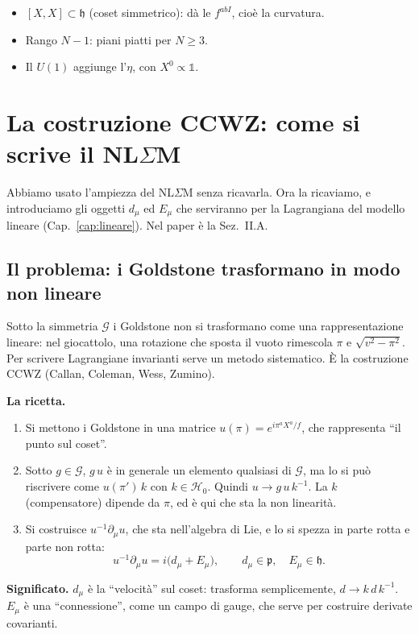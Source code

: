 \documentclass[11pt,a4paper]{article}
\numberwithin{equation}{section}
\theoremstyle{remark}
\newcommand{\G}{\mathcal{G}}
\newcommand{\Hg}{\mathcal{H}_0}
\newcommand{\p}{\mathfrak{p}}
\newcommand{\h}{\mathfrak{h}}
\newcommand{\one}{\mathbb{1}}
\begin{document}
\begin{porta}
\begin{itemize}[nosep]
\item $[X,X]\subset\h$ (coset simmetrico): dà le $f^{abI}$, cioè la curvatura.
\item Rango $N-1$: piani piatti per $N\ge3$.
\item Il $U(1)$ aggiunge l'$\eta$, con $X^0\propto\one$.
\end{itemize}
\end{porta}

\section{La costruzione CCWZ: come si scrive il NL$\Sigma$M}
\label{cap:ccwz}

\begin{dove}
Abbiamo usato l'ampiezza del NL$\Sigma$M senza ricavarla. Ora la ricaviamo, e introduciamo gli oggetti $d_\mu$ ed $E_\mu$ che serviranno per la Lagrangiana del modello lineare (Cap.~\ref{cap:lineare}). Nel paper è la Sez.~II.A.
\end{dove}

\subsection{Il problema: i Goldstone trasformano in modo non lineare}

Sotto la simmetria $\G$ i Goldstone non si trasformano come una rappresentazione lineare: nel giocattolo, una rotazione che sposta il vuoto rimescola $\pi$ e $\sqrt{v^2-\pi^2}$. Per scrivere Lagrangiane invarianti serve un metodo sistematico. È la costruzione CCWZ (Callan, Coleman, Wess, Zumino).

\textbf{La ricetta.}
\begin{enumerate}
\item Si mettono i Goldstone in una matrice $u(\pi)=e^{i\pi^aX^a/f}$, che rappresenta ``il punto sul coset''.
\item Sotto $g\in\G$, $g\,u$ è in generale un elemento qualsiasi di $\G$, ma lo si può riscrivere come $u(\pi')\,k$ con $k\in\Hg$. Quindi $u\to g\,u\,k^{-1}$. La $k$ (compensatore) dipende da $\pi$, ed è qui che sta la non linearità.
\item Si costruisce $u^{-1}\partial_\mu u$, che sta nell'algebra di Lie, e lo si spezza in parte rotta e parte non rotta:
\begin{equation}
u^{-1}\partial_\mu u=i\big(d_\mu+E_\mu\big),\qquad d_\mu\in\p,\quad E_\mu\in\h .
\end{equation}
\end{enumerate}
\textbf{Significato.} $d_\mu$ è la ``velocità'' sul coset: trasforma semplicemente, $d\to k\,d\,k^{-1}$. $E_\mu$ è una ``connessione'', come un campo di gauge, che serve per costruire derivate covarianti.
\end{document}
